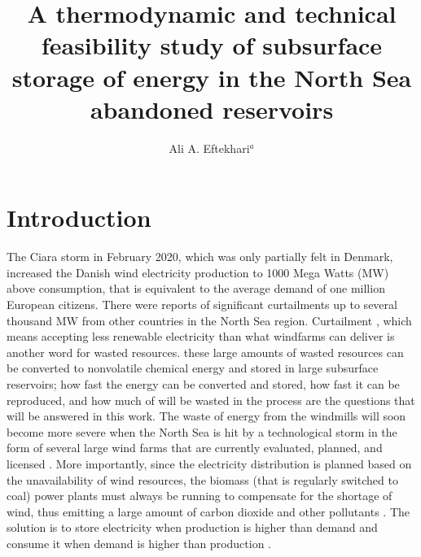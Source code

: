 \documentclass{ECOS_2021}
\title{\sffamily A thermodynamic and technical feasibility study of subsurface storage of energy in the North Sea abandoned reservoirs}
\author{Ali A. Eftekhari$^{a}$}
\begin{document}

\sffamily \section{Introduction} \label{chap:Problem-definition} 
 \normalsize
The Ciara storm in February 2020, which was only partially felt in Denmark, increased
the Danish wind electricity production to 1000 Mega Watts (MW) above
consumption, that is equivalent to the average demand
of one million European citizens. There were reports of significant
curtailments up to several thousand MW from other countries in the
North Sea region. Curtailment \cite{lewWindSolarCurtailment2013},
which means accepting less renewable electricity than what windfarms
can deliver is another word for wasted resources. these large amounts of 
wasted resources can be converted to nonvolatile chemical energy and stored 
in large subsurface reservoirs; how fast the energy can be converted and stored, 
how fast it can be reproduced, and how much of will be wasted in the process are 
the questions that will be answered in this work. 
The waste of energy from the windmills will soon become
more severe when the North Sea is hit by a technological storm in
the form of several large wind farms that are currently evaluated,
planned, and licensed \cite{GlobalOffshoreRenewable}. More importantly,
since the electricity distribution is planned based on the unavailability
of wind resources, the biomass (that is regularly switched to coal)
power plants must always be running to compensate for the shortage
of wind, thus emitting a large amount of carbon dioxide and other
pollutants \cite{meibomEnergyComesTogether2013}. The solution is
to store electricity when production is higher than demand and consume
it when demand is higher than production \cite{pedersenEnergyStorageTechnologies2019}. 
\end{document}
